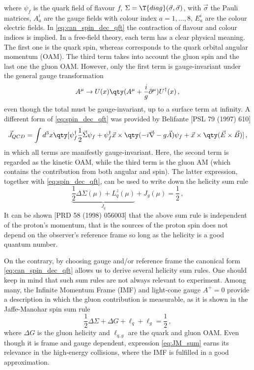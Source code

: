 where $\psi_{f}$ is the quark field of flavour $f$, $\Sigma = \T{diag} (\vec{\sigma}, \vec{\sigma})$, with $\vec{\sigma}$ the Pauli matrices, $A_{a}^{i}$ are the gauge fields with colour index $a=1,\dots,8$, $E_{a}^{i}$ are the colour electric fields. In \eqref{eq:can_spin_dec_qft} the contraction of flavour and colour indices is implied. In a free-field theory, each term has a clear physical meaning. The first one is the quark spin, whereas corresponds to the quark orbital angular momentum (OAM). The third term takes into account the gluon spin and the last one the gluon OAM. However, only the first term is gauge-invariant under the general gauge transformation 
\begin{equation}
    A^{\mu} \rightarrow U(x) \qty( A^{\mu} + \frac{i}{g}\partial^{\mu} ) U^{\dag}(x)\,,
\end{equation}
even though the total must be gauge-invariant, up to a surface term at infinity. A different form of \eqref{eq:spin_dec_qft} was provided by Belifante [PSL 79 (1997) 610] 
\begin{equation}
    \vec{J}_{QCD} = \int d^3 x \qty [ \psi^{\dag}_{f} \frac{1}{2} \vec{\Sigma} \psi_{f} +  \psi^{\dag}_{f} \vec{x} \times \qty(-i \vec{\nabla} - g \vec{A}) \psi_{f} + \vec{x} \times \qty( \vec{E} \times \vec{B} ) ] \,,
    \label{eq:spin_dec_qft}
\end{equation}
in which all terms are manifestly gauge-invariant. Here, the second term is regarded as the kinetic OAM, while the third term is the gluon AM (which contains the contribution from both angular and spin). The latter expression, together with \eqref{eq:spin_dec_qft}, can be used to write down the helicity sum rule
\begin{equation}
    \underbrace{\frac{1}{2} \Delta \Sigma (\mu) + L_{q}^{z} (\mu)}_{J_{q}} + J_{g} (\mu) = \frac{1}{2} \,,
\end{equation}
It can be shown [PRD 58 (1998) 056003] that the above sum rule is independent of the proton's momentum, that is the sources of the proton spin does not depend on the observer's reference frame so long as the helicity is a good quantum number.\par
On the contrary, by choosing gauge and/or reference frame the canonical form \eqref{eq:can_spin_dec_qft} allows us to derive several helicity sum rules. One should keep in mind that such sum rules are not always relevant to experiment. Among many, the Infinite Momentum Frame (IMF) and light-cone gauge $A^+ = 0$ provide a description in which the gluon contribution is measurable, as it is shown in the Jaffe-Manohar spin sum rule
\begin{equation}
    \frac{1}{2} \Delta \Sigma + \Delta G + \ell_{q} + \ell_{g} = \frac{1}{2}\,,
    \label{eq:JM_sum}
\end{equation}
where $\Delta G$ is the gluon helicity and $\ell_{q,g}$ are the quark and gluon OAM. Even though it is frame and gauge dependent, expression \eqref{eq:JM_sum} earns its relevance in the high-energy collisions, where the IMF is fulfilled in a good approximation.
